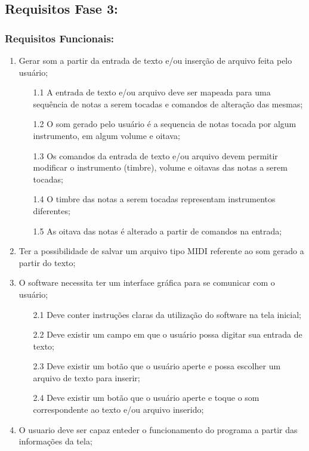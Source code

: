 \documentclass[12pt]{article}
\begin{document}
\newpage

\subsection{Requisitos Fase 3:}
\subsubsection{Requisitos Funcionais:}

\begin{enumerate}
    \item Gerar som a partir da entrada de texto e/ou inserção de arquivo feita pelo usuário;
    \begin{enumerate}
        \item[1.1] A entrada de texto e/ou arquivo deve ser mapeada para uma sequência de notas a serem tocadas e comandos de alteração das mesmas;
        \item[1.2] O som gerado pelo usuário é a sequencia de notas tocada por algum instrumento, em algum volume e oitava;
        \item[1.3] Os comandos da entrada de texto e/ou arquivo devem permitir modificar o instrumento (timbre), volume e oitavas das notas a serem tocadas;
        \item[1.4] O timbre das notas a serem tocadas representam instrumentos diferentes;
        \item[1.5] As oitava das notas é alterado a partir de comandos na entrada;
    \end{enumerate}
    
    \item Ter a possibilidade de salvar um arquivo tipo MIDI referente ao som gerado a partir do texto;
    
    \item O software necessita ter um interface gráfica para se comunicar com o usuário;
    \begin{enumerate}
        \item[2.1] Deve conter instruções claras da utilização do software na tela inicial;
        \item[2.2] Deve existir um campo em que o usuário possa digitar sua entrada de texto;
        \item [2.3] Deve existir um botão que o usuário aperte e possa escolher um arquivo de texto para inserir;
        \item[2.4] Deve existir um botão que o usuário aperte e toque o som correspondente ao texto e/ou arquivo inserido;
    \end{enumerate}

    \item O usuario deve ser capaz enteder o funcionamento do programa a partir das informações da tela;
\end{enumerate}
    
\end{document}
